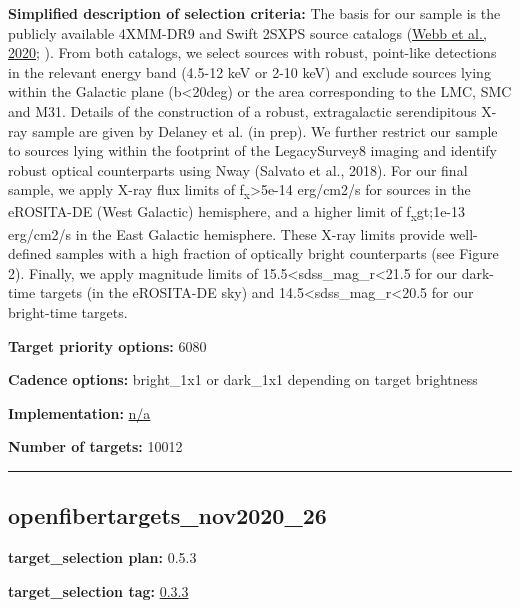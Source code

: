 \noindent\textbf{Simplified description of selection criteria:} The basis for our
sample is the publicly available 4XMM-DR9 and Swift 2SXPS source
catalogs
(\href{https://ui.adsabs.harvard.edu/abs/2020A\%26A...641A.136W/abstract}{Webb
et al., 2020};
\citealt{Evans2020}). From both catalogs, we select sources with robust,
point-like detections in the relevant energy band (4.5-12 keV or 2-10
keV) and exclude sources lying within the Galactic plane
(\textbar b\textbar\textless20deg) or the area corresponding to the LMC,
SMC and M31. Details of the construction of a robust, extragalactic
serendipitous X-ray sample are given by Delaney et al. (in prep). We
further restrict our sample to sources lying within the footprint of the
LegacySurvey8 imaging and identify robust optical counterparts using
Nway (Salvato et al., 2018). For our final sample, we apply X-ray flux
limits of f\textsubscript{x}\textgreater5e-14 erg/cm2/s for sources in
the eROSITA-DE (West Galactic) hemisphere, and a higher limit of
f\textsubscript{x}gt;1e-13 erg/cm2/s in the East Galactic hemisphere.
These X-ray limits provide well-defined samples with a high fraction of
optically bright counterparts (see Figure 2). Finally, we apply
magnitude limits of 15.5\textless sdss\_mag\_r\textless21.5 for our
dark-time targets (in the eROSITA-DE sky) and
14.5\textless sdss\_mag\_r\textless20.5 for our bright-time targets.


\noindent\textbf{Target priority options:} 6080

\noindent\textbf{Cadence options:} bright\_1x1 or dark\_1x1 depending on target
brightness

\noindent\textbf{Implementation:}
\href{https://github.com/sdss/target_selection/blob/0.3.3/python/target_selection/cartons/n/a}{n/a}

\noindent\textbf{Number of targets:} 10012

\begin{center}\rule{0.5\linewidth}{0.5pt}\end{center}

\hypertarget{openfibertargets_nov2020_26_plan0.5.3}{%
\subsection{openfibertargets\_nov2020\_26}\label{openfibertargets_nov2020_26_plan0.5.3}}

\noindent\textbf{target\_selection plan:} 0.5.3

\noindent\textbf{target\_selection tag:}
\href{https://github.com/sdss/target_selection/tree/0.3.3/}{0.3.3}

